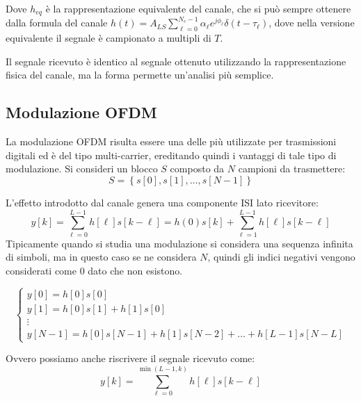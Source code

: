 Dove $h_{eq}$ è la rappresentazione equivalente del canale, che si può sempre ottenere dalla formula del canale $ h(t) = A_{LS} \sum_{\ell=0}^{N_c-1} \alpha_{\ell} e^{j\phi_{\ell}} \delta(t - \tau_{\ell})$, dove nella versione equivalente il segnale è campionato a multipli di $T$.

Il segnale ricevuto è identico al segnale ottenuto utilizzando la rappresentazione fisica del canale, ma la forma permette un'analisi più semplice.


\subsection*{Modulazione OFDM}
La modulazione OFDM risulta essere una delle più utilizzate per trasmissioni digitali ed è del tipo multi-carrier, ereditando quindi i vantaggi di tale tipo di modulazione.
Si consideri un blocco $S$ composto da $N$ campioni da trasmettere:
\[
  S = \left\{s\left[0\right], s\left[1\right], \ldots, s\left[N-1\right]\right\}
\]

L'effetto introdotto dal canale genera una componente ISI lato ricevitore:
\[
  y\left[k\right] = \sum_{\ell=0}^{L-1} h\left[\ell\right] s\left[k - \ell\right] = h(0)s\left[k\right] + \sum_{\ell=1}^{L-1} h\left[\ell\right] s\left[k - \ell\right]
\]
Tipicamente quando si studia una modulazione si considera una sequenza infinita di simboli, ma in questo caso se ne considera $N$, quindi gli indici negativi vengono considerati come 0 dato che non esistono.


\[
    \begin{cases}
        y[0] = h[0]s[0] \\
        y[1] = h[0]s[1] + h[1]s[0] \\
        \vdots \\
        y[N-1] = h[0]s[N-1] + h[1]s[N-2] + \ldots + h[L-1]s[N-L]
    \end{cases}
\]

Ovvero possiamo anche riscrivere il segnale ricevuto come:
\[
y[k] = \sum_{\ell=0}^{\min(L-1, k)} h[\ell] s[k-\ell]
\]


